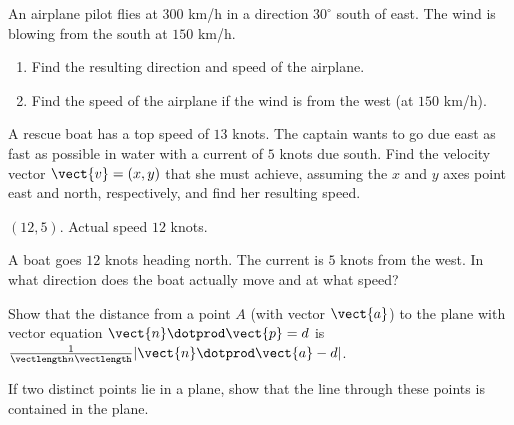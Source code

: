 \begin{multicols}{2}
\begin{supex}
\begin{supsol}
\end{supsol}
\end{supex}

\begin{supex}
An airplane pilot flies at $300$ km/h in a direction $30^\circ$ south of east. The wind is blowing from the south at $150$ km/h.


\begin{enumerate}[label={\alph*.}]
\item Find the resulting direction and speed of the airplane.

\item Find the speed of the airplane if the wind is from the west (at $150$ km/h).

\end{enumerate}
\end{supex}

\begin{supex}
A rescue boat has a top speed of $13$ knots. The captain wants to go due east as fast as possible in water with a current of $5$ knots due south. 
Find the velocity vector $\vect{v} = (x, y)$ that she must achieve, assuming the $x$ and $y$ axes point east and north, respectively, and find her resulting speed.

\begin{supsol}
$(12, 5)$. Actual speed $12$ knots.

\end{supsol}
\end{supex}


\begin{supex}
A boat goes $12$ knots heading north. The current is $5$ knots from the west. In what direction does the boat actually move and at what speed?

\end{supex}

\begin{supex}
Show that the distance from a point $A$ (with vector $\vect{a}$) to the plane with vector equation $\vect{n} \dotprod \vect{p} = d$ is $\frac{1}{\vectlength n \vectlength}|\vect{n} \dotprod \vect{a} - d|$.

\end{supex}

\begin{supex}
If two distinct points lie in a plane, show that the line through these points is contained in the plane.

\end{supex}




\end{multicols}
